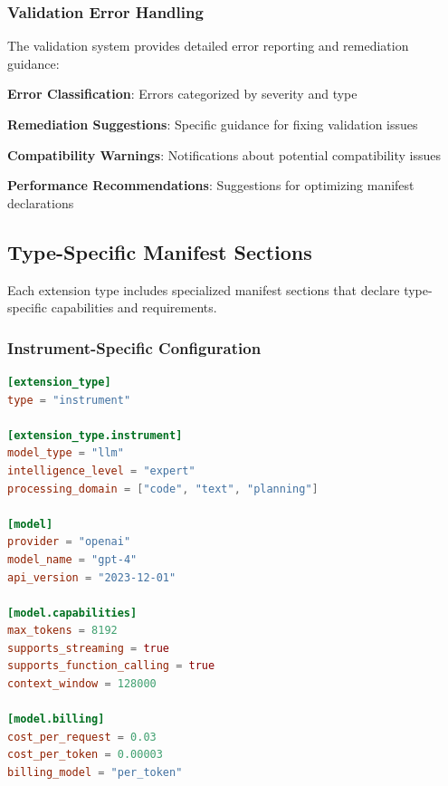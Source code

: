 \subsubsection{Validation Error Handling}
\label{subsubsec:validation-error-handling}

The validation system provides detailed error reporting and remediation guidance:

\begin{compactlist}
\item \textbf{Error Classification}: Errors categorized by severity and type
\item \textbf{Remediation Suggestions}: Specific guidance for fixing validation issues
\item \textbf{Compatibility Warnings}: Notifications about potential compatibility issues
\item \textbf{Performance Recommendations}: Suggestions for optimizing manifest declarations
\end{compactlist}

\subsection{Type-Specific Manifest Sections}
\label{subsec:type-specific-manifest-sections}

Each extension type includes specialized manifest sections that declare type-specific capabilities and requirements.

\subsubsection{Instrument-Specific Configuration}
\label{subsubsec:instrument-specific-configuration}

\begin{lstlisting}[language=toml,caption=Instrument Extension Manifest]
[extension_type]
type = "instrument"

[extension_type.instrument]
model_type = "llm"
intelligence_level = "expert"
processing_domain = ["code", "text", "planning"]

[model]
provider = "openai"
model_name = "gpt-4"
api_version = "2023-12-01"

[model.capabilities]
max_tokens = 8192
supports_streaming = true
supports_function_calling = true
context_window = 128000

[model.billing]
cost_per_request = 0.03
cost_per_token = 0.00003
billing_model = "per_token"
\end{lstlisting}

